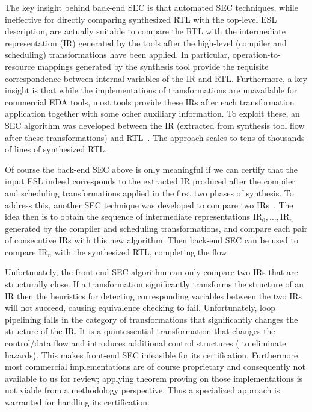  The key insight behind
back-end SEC is that automated SEC techniques, while
ineffective for directly comparing synthesized RTL with the
top-level ESL description, are actually suitable to compare
the RTL with the intermediate representation (IR) generated
by the tools after the high-level (compiler and scheduling)
transformations have been applied.  In particular,
operation-to-resource mappings generated by the synthesis
tool provide the requisite correspondence between internal
variables of the IR and RTL.  Furthermore, a key insight is
that while the implementations of transformations are
unavailable for commercial EDA tools, most tools provide
these IRs after each transformation application together
with some other auxiliary information.  To exploit these, an
SEC algorithm was developed between the IR (extracted from
synthesis tool flow after these transformations) and
RTL~\cite{rhcxy:atva-09,hxry:date-10,kechengthesis,Yang2013}. 
The approach scales
to tens of thousands of lines of synthesized RTL.

\medskip

 Of course the back-end SEC
above is only meaningful if we can certify that the input
ESL indeed corresponds to the extracted IR produced after
the compiler and scheduling transformations applied in the
first two phases of synthesis. To address this, another SEC
technique was developed to compare two IRs~\cite{zhenkun:iccd-13,zhenkun2,zhenkun3}.  The idea then
is to obtain the sequence of intermediate representations
$\mbox{IR}_0,\ldots,\mbox{IR}_n$ generated by the compiler
and scheduling transformations, and compare each pair of
consecutive IRs with this new algorithm.  Then back-end SEC
can be used to compare $\mbox{IR}_n$ with the synthesized
RTL, completing the flow.

\bigskip

 Unfortunately, the front-end SEC
algorithm can only compare two IRs that are structurally close.  If a
transformation significantly transforms the structure of an IR then
the heuristics for detecting corresponding variables between the two
IRs will not succeed, causing equivalence checking to fail.
Unfortunately, loop pipelining falls in the category of
transformations that significantly changes the structure of the IR.
It is a quintessential transformation that changes the control/data
flow and introduces additional control structures (%
to eliminate
hazards).  This makes front-end SEC infeasible for its certification.
Furthermore, most commercial implementations are of course
proprietary and consequently not available to us for review; applying
theorem proving on those implementations is not viable from a
methodology perspective.  Thus a specialized approach is warranted for
handling its certification.


